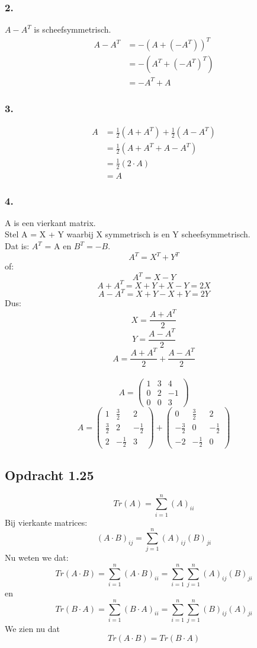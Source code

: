 \documentclass[lineaire_algebra_oplossingen.tex]{subfiles}
\begin{document}
\subsubsection*{2.}
$A - A^T$ is scheefsymmetrisch.
\begin{align*}
A - A^T
&= -(A+(-A^T))^T \\
&= -(A^T + (-A^T)^T) \\
&= -A^T + A
\end{align*}
\subsubsection*{3.}
\begin{align*}
A 
&= \frac{1}{2}(A + A^T) + \frac{1}{2}(A - A^T) \\
&= \frac{1}{2}(A + A^T + A - A^T) \\
&= \frac{1}{2}(2\cdot A) \\
&= A
\end{align*}
\subsubsection*{4.}
A is een vierkant matrix.\\
Stel A = X + Y waarbij X symmetrisch is en Y scheefsymmetrisch.\\
Dat is: $A^T$ = A en $B^T = -B$.
$$A^T = X^T + Y^T$$
of: $$A^T = X - Y$$
$$A + A^T = X + Y + X - Y = 2X$$
$$A - A^T = X + Y - X + Y = 2Y$$
Dus:
$$X = \frac{A + A^T}{2}$$
$$Y = \frac{A - A^T}{2}$$
$$A = \frac{A + A^T}{2} + \frac{A - A^T}{2}$$
\\
$$
A = \begin{pmatrix}
1 & 3 & 4\\
0 & 2 & -1\\
0 & 0 & 3
\end{pmatrix}
$$
$$
A = \begin{pmatrix}
1 & \frac{3}{2} & 2\\
\frac{3}{2} & 2 & -\frac{1}{2}\\
2 & -\frac{1}{2} & 3
\end{pmatrix}
+
\begin{pmatrix}
0 & \frac{3}{2} & 2\\
-\frac{3}{2} & 0 & -\frac{1}{2}\\
-2 & -\frac{1}{2} & 0
\end{pmatrix}
$$
\subsection{Opdracht 1.25}
\[
Tr(A) = \sum^{n}_{i=1}(A)_{ii}
\]
Bij vierkante matrices:
\[
(A\cdot B)_{ij} = \sum^{n}_{j=1}(A)_{ij}(B)_{ji}
\]
Nu weten we dat:
\[
Tr(A\cdot B) =\sum^{n}_{i=1}(A\cdot B)_{ii}=\sum^{n}_{i=1}\sum^{n}_{j=1}(A)_{ij}(B)_{ji}
\]
en
\[
Tr(B\cdot A) =\sum^{n}_{i=1}(B\cdot A)_{ii}=\sum^{n}_{i=1}\sum^{n}_{j=1}(B)_{ij}(A)_{ji}
\]
We zien nu dat
\[
Tr(A\cdot B) = Tr(B\cdot A)
\]
\end{document}
